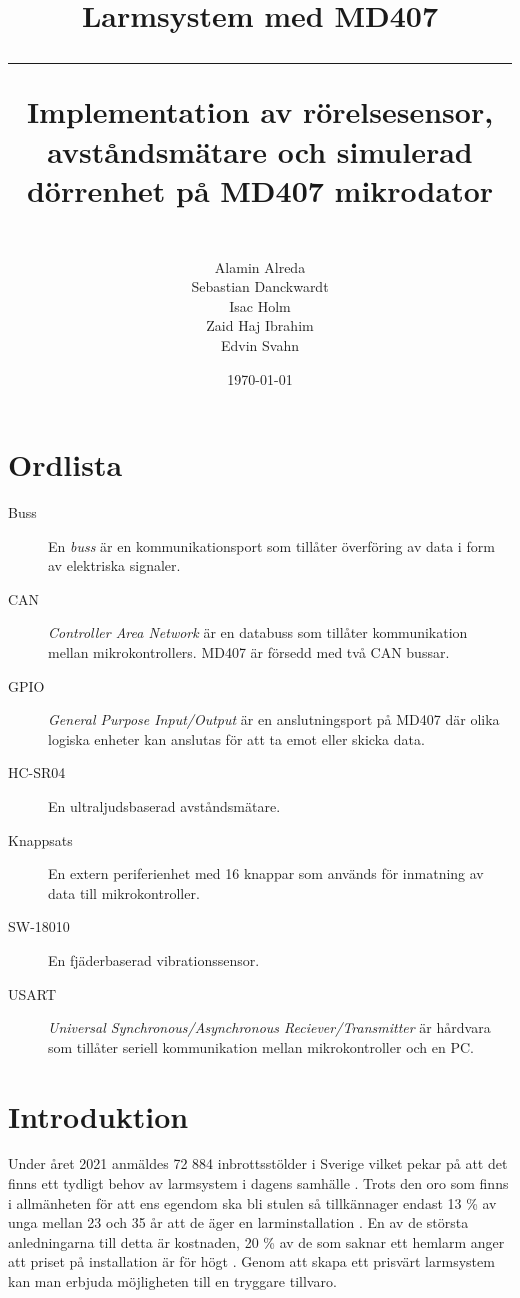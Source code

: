 \documentclass{article}
\title{\textbf{Larmsystem med MD407}\\ 
\hspace{10cm}
\hrule
\hspace{10cm}
Implementation av rörelsesensor, avståndsmätare och simulerad dörrenhet på MD407 mikrodator}
\author{\\Alamin Alreda\\Sebastian Danckwardt\\Isac Holm\\Zaid Haj Ibrahim\\Edvin Svahn}
\date{\today}
\begin{document}
\maketitle
\newpage
\tableofcontents
\newpage
\section*{Ordlista}
\begin{description}

\item[Buss] En \emph{buss} är en kommunikationsport som tillåter överföring av data i form av elektriska signaler.

\item[CAN] \emph{Controller Area Network} är en databuss som tillåter kommunikation mellan mikrokontrollers. MD407 är försedd med två CAN bussar.

\item[GPIO] \emph{General Purpose Input/Output} är en anslutningsport på MD407 där olika logiska enheter kan anslutas för att ta emot eller skicka data.

\item[HC-SR04] En ultraljudsbaserad avståndsmätare.

\item[Knappsats] En extern periferienhet med 16 knappar som används för inmatning av data till mikrokontroller.

\item[SW-18010] En fjäderbaserad vibrationssensor.

\item[USART] \emph{Universal Synchronous/Asynchronous Reciever/Transmitter} är hårdvara som tillåter seriell kommunikation mellan mikrokontroller och en PC.

\end{description}
 \newpage

\setcounter{page}{1}
\section{Introduktion}

Under året 2021 anmäldes 72 884 inbrottsstölder i Sverige vilket pekar på att det finns ett tydligt behov av larmsystem i dagens samhälle \cite{BRa}.
Trots den oro som finns i allmänheten för att ens egendom ska bli stulen så tillkännager endast 13 \% av unga mellan 23 och 35 år att de äger en larminstallation \cite{MoFor}.
En av de största anledningarna till detta är kostnaden, 20 \% av de som saknar ett hemlarm anger att priset på installation är för högt \cite{MoFor}.
Genom att skapa ett prisvärt larmsystem kan man erbjuda möjligheten till en tryggare tillvaro.
\end{document}
